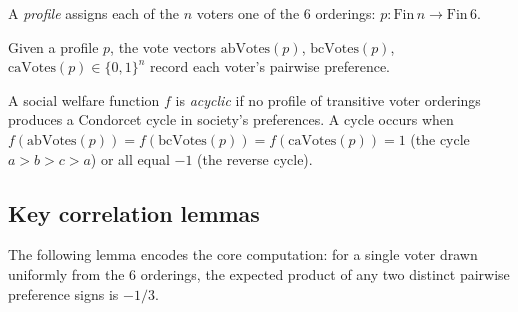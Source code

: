 \begin{definition}[Profile]
\label{ArrowTheorem.Profile}
\leanok
A \emph{profile} assigns each of the $n$ voters one of the 6 orderings:
$p : \mathrm{Fin}\,n \to \mathrm{Fin}\,6$.
\end{definition}

\begin{definition}
\label{ArrowTheorem.abVotes}
\label{ArrowTheorem.bcVotes}
\label{ArrowTheorem.caVotes}
\leanok
{}
Given a profile $p$, the vote vectors $\mathrm{abVotes}(p)$,
$\mathrm{bcVotes}(p)$, $\mathrm{caVotes}(p) \in \{0,1\}^n$ record each
voter's pairwise preference.
\end{definition}

\begin{definition}[Acyclicity]
\label{ArrowTheorem.acyclic}
\leanok
{}
A social welfare function $f$ is \emph{acyclic} if no profile of transitive
voter orderings produces a Condorcet cycle in society's preferences.
A cycle occurs when
$f(\mathrm{abVotes}(p)) = f(\mathrm{bcVotes}(p)) = f(\mathrm{caVotes}(p)) = 1$
(the cycle $a>b>c>a$) or all equal $-1$ (the reverse cycle).
\end{definition}

\subsection{Key correlation lemmas}

The following lemma encodes the core computation: for a single voter drawn
uniformly from the 6 orderings, the expected product of any two distinct
pairwise preference signs is $-1/3$.

